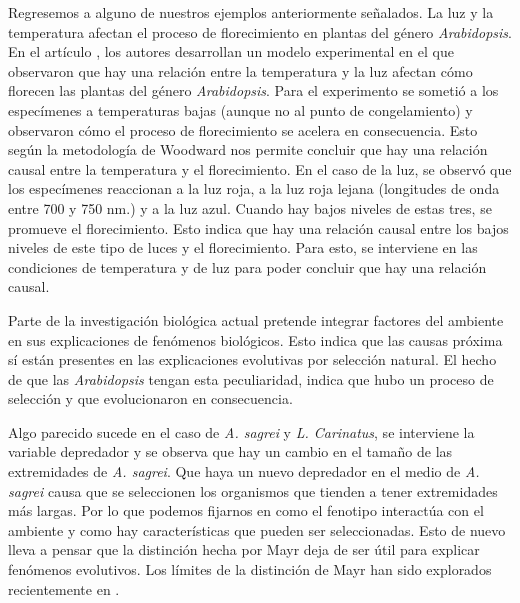 Regresemos a alguno de nuestros ejemplos anteriormente señalados. La luz y la temperatura afectan el proceso de florecimiento en plantas del género \emph{Arabidopsis}. En el artículo \cite{AusinEnviro}, los autores desarrollan un modelo experimental en el que observaron que hay una relación entre la temperatura y la luz afectan cómo florecen las plantas del género \emph{Arabidopsis}. Para el experimento se sometió a los especímenes a temperaturas bajas (aunque no al punto de congelamiento) y observaron cómo el proceso de florecimiento se acelera en consecuencia. Esto según la metodología de Woodward nos permite concluir que hay una relación causal entre la temperatura y el florecimiento. En el caso de la luz, se observó que los especímenes reaccionan a la luz roja, a la luz roja lejana (longitudes de onda entre 700 y 750 nm.) y a la luz azul. Cuando hay bajos niveles de estas tres, se promueve el florecimiento. Esto indica que hay una relación causal entre los bajos niveles de este tipo de luces y el florecimiento. Para esto, se interviene en las condiciones de temperatura y de luz para poder concluir que hay una relación causal.

\begin{center}
\end{center}

Parte de la investigación biológica actual pretende integrar factores del ambiente en sus explicaciones de fenómenos biológicos. Esto indica que las causas próxima sí están presentes en las explicaciones evolutivas por selección natural. El hecho de que las \emph{Arabidopsis} tengan esta peculiaridad, indica que hubo un proceso de selección y que evolucionaron en consecuencia.

Algo parecido sucede en el caso de \emph{A. sagrei} y \emph{L. Carinatus}, se interviene la variable depredador y se observa que hay un cambio en el tamaño de las extremidades de \emph{A. sagrei}. Que haya un nuevo depredador en el medio de \emph{A. sagrei} causa que se seleccionen los organismos que tienden a tener extremidades más largas. Por lo que podemos fijarnos en como el fenotipo interactúa con el ambiente y como hay características que pueden ser seleccionadas. Esto de nuevo lleva a pensar que la distinción hecha por Mayr deja de ser útil para explicar fenómenos evolutivos. Los límites de la distinción de Mayr han sido explorados recientemente en \cite{Uller2020, Dayan2020, Laland2011}.

